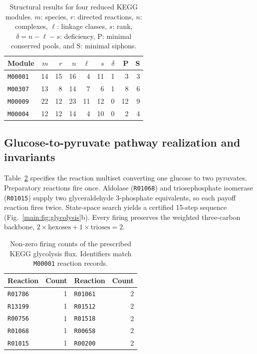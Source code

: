 \documentclass[10pt,a4paper,fleqn]{article}
\theoremstyle{plain}\newtheorem{theorem}{Theorem}
\begin{document}
\begin{table}[htbp]
\centering
\caption{Structural results for four reduced KEGG modules. $m$: species, $r$: directed reactions, $n$: complexes, $\ell$: linkage classes, $s$: rank, $\delta=n-\ell-s$: deficiency, P: minimal conserved pools, and S: minimal siphons.}
\label{tab:kegg_modules}
\small
\begin{tabular*}{\linewidth}{@{\extracolsep{\fill}}lrrrrrrrr@{}}
\toprule
Module & $m$ & $r$ & $n$ & $\ell$ & $s$ & $\delta$ & P & S \\
\midrule
\texttt{M00001} & 14 & 15 & 16 & 4 & 11 & 1 & 3 & 3 \\
\texttt{M00307} & 13 & 8 & 14 & 7 & 6 & 1 & 8 & 6 \\
\texttt{M00009} & 22 & 12 & 23 & 11 & 12 & 0 & 12 & 9 \\
\texttt{M00004} & 12 & 12 & 14 & 4 & 10 & 0 & 2 & 4 \\
\bottomrule
\end{tabular*}
\end{table}

\subsection{Glucose-to-pyruvate pathway realization and invariants}

Table~\ref{tab:glycolysis_flux} specifies the reaction multiset converting one glucose to two pyruvates. Preparatory reactions fire once. Aldolase (\texttt{R01068}) and triosephosphate isomerase (\texttt{R01015}) supply two glyceraldehyde 3-phosphate equivalents, so each payoff reaction fires twice. State-space search yields a certified 15-step sequence (Fig.~\ref{main:fig:glycolysis}b). Every firing preserves the weighted three-carbon backbone, $2\times\text{hexoses} + 1\times\text{trioses} = 2$.

\begin{table}[htbp]
\centering
\caption{Non-zero firing counts of the prescribed KEGG glycolysis flux. Identifiers match \texttt{M00001} reaction records.}
\label{tab:glycolysis_flux}
\begin{tabular*}{\linewidth}{@{\extracolsep{\fill}}lrlr@{}}
\toprule
Reaction & Count & Reaction & Count \\
\midrule
\texttt{R01786} & 1 & \texttt{R01061} & 2 \\
\texttt{R13199} & 1 & \texttt{R01512} & 2 \\
\texttt{R00756} & 1 & \texttt{R01518} & 2 \\
\texttt{R01068} & 1 & \texttt{R00658} & 2 \\
\texttt{R01015} & 1 & \texttt{R00200} & 2 \\
\bottomrule
\end{tabular*}
\end{table}
\end{document}
